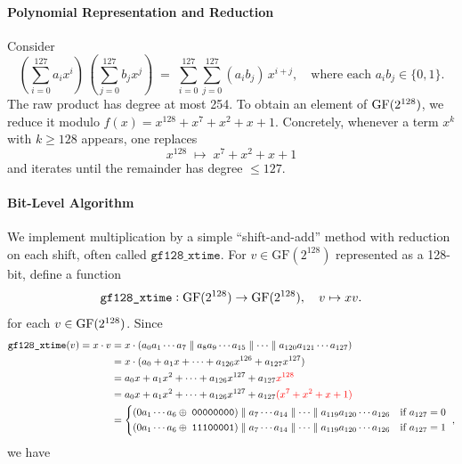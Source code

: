 \paragraph{Polynomial Representation and Reduction}
Consider \[
\left(\sum_{i=0}^{127}a_i x^i\right)\,\left(\sum_{j=0}^{127}b_j x^j\right)
\;=\;\sum_{i=0}^{127}\sum_{j=0}^{127}(a_i b_j)\,x^{i+j},\quad\text{where each $a_i b_j\in\{0,1\}$}.
\] The raw product has degree at most 254.  To obtain an element of 
\(\operatorname{GF}(2^{128})\), we reduce it modulo $
f(x)=x^{128}+x^7+x^2+x+1$.
Concretely, whenever a term \(x^k\) with \(k\ge128\) appears, one replaces 
\[
x^{128}\;\mapsto\;x^7+x^2+x+1
\]
and iterates until the remainder has degree \(\le127\).

\paragraph{Bit-Level Algorithm}
We implement multiplication by a simple ``shift-and-add'' method with reduction on each
shift, often called \(\mathtt{gf128\_xtime}\). For \(v\in\mathrm{GF}(2^{128})\) represented as a 128-bit, define a function \[
\texttt{gf128\_xtime}:\operatorname{GF}(2^{128})\to\operatorname{GF}(2^{128}),\quad v\mapsto xv.
\] for each $v\in\operatorname{GF}(2^{128})$. Since \begin{align*}
\texttt{gf128\_xtime}(v)=x\cdot v
&=x\cdot(a_{0}a_{1}\cdots a_{7}\parallel a_{8}a_{9}\cdots a_{15}\parallel\cdots\parallel a_{120}a_{121}\cdots a_{127}) \\
&=x\cdot (a_0+a_1x+\cdots +a_{126}x^{126} +a_{127}x^{127}) \\
&=a_0x+a_1x^2+\cdots+a_{126}x^{127}+a_{127}{\color{red}x^{128}}\\
&=a_0x+a_1x^2+\cdots+a_{126}x^{127}+a_{127}{\color{red}(x^7+x^2+x+1)}\\
&=\begin{cases*}
(0a_1\cdots a_6\oplus\;\texttt{00000000})\parallel a_{7}\cdots a_{14}\parallel\cdots\parallel a_{119}a_{120}\cdots a_{126}  &if $a_{127}=0$\\
(0a_1\cdots a_6\oplus\;\texttt{11100001})\parallel a_{7}\cdots a_{14}\parallel\cdots\parallel a_{119}a_{120}\cdots a_{126}  &if $a_{127}=1$
\end{cases*},
\end{align*} we have
